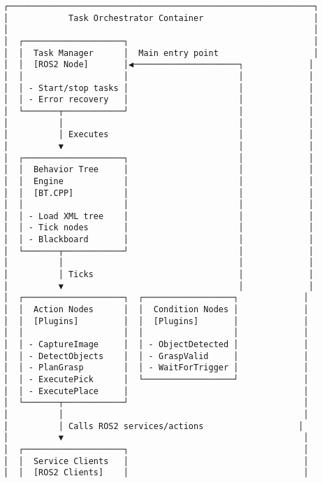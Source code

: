\documentclass[
]{article}
\begin{document}
\begin{verbatim}
┌─────────────────────────────────────────────────────────────┐
│            Task Orchestrator Container                      │
│                                                             │
│  ┌────────────────────┐                                     │
│  │  Task Manager      │  Main entry point                   │
│  │  [ROS2 Node]       │◀─────────────────────┐             │
│  │                    │                      │             │
│  │ - Start/stop tasks │                      │             │
│  │ - Error recovery   │                      │             │
│  └───────┬────────────┘                      │             │
│          │                                   │             │
│          │ Executes                          │             │
│          ▼                                   │             │
│  ┌────────────────────┐                      │             │
│  │  Behavior Tree     │                      │             │
│  │  Engine            │                      │             │
│  │  [BT.CPP]          │                      │             │
│  │                    │                      │             │
│  │ - Load XML tree    │                      │             │
│  │ - Tick nodes       │                      │             │
│  │ - Blackboard       │                      │             │
│  └───────┬────────────┘                      │             │
│          │                                   │             │
│          │ Ticks                             │             │
│          ▼                                   │             │
│  ┌────────────────────┐  ┌──────────────────┐             │
│  │  Action Nodes      │  │  Condition Nodes │             │
│  │  [Plugins]         │  │  [Plugins]       │             │
│  │                    │  │                  │             │
│  │ - CaptureImage     │  │ - ObjectDetected │             │
│  │ - DetectObjects    │  │ - GraspValid     │             │
│  │ - PlanGrasp        │  │ - WaitForTrigger │             │
│  │ - ExecutePick      │  └──────────────────┘             │
│  │ - ExecutePlace     │                                   │
│  └───────┬────────────┘                                   │
│          │                                                │
│          │ Calls ROS2 services/actions                   │
│          ▼                                                │
│  ┌────────────────────┐                                   │
│  │  Service Clients   │                                   │
│  │  [ROS2 Clients]    │                                   │

\end{verbatim}
\end{document}
